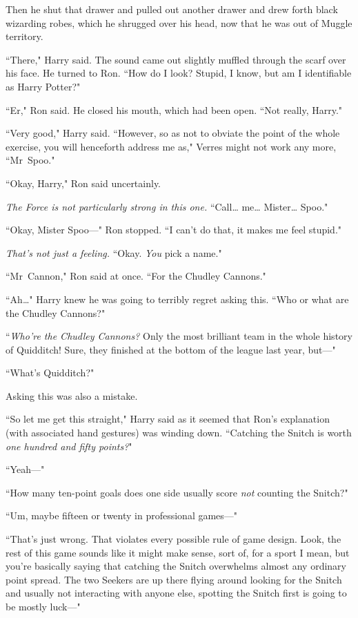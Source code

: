 Then he shut that drawer and pulled out another drawer and drew forth black wizarding robes, which he shrugged over his head, now that he was out of Muggle territory.

``There," Harry said. The sound came out slightly muffled through the scarf over his face. He turned to Ron. ``How do I look? Stupid, I know, but am I identifiable as Harry Potter?"

``Er," Ron said. He closed his mouth, which had been open. ``Not really, Harry."

``Very good," Harry said. ``However, so as not to obviate the point of the whole exercise, you will henceforth address me as," Verres might not work any more, ``Mr~Spoo."

``Okay, Harry," Ron said uncertainly.

\emph{The Force is not particularly strong in this one.} ``Call{\ldots} me{\ldots} Mister{\ldots} Spoo."

``Okay, Mister Spoo—" Ron stopped. ``I can't do that, it makes me feel stupid."

\emph{That's not just a feeling.} ``Okay. \emph{You} pick a name."

``Mr~Cannon," Ron said at once. ``For the Chudley Cannons."

``Ah{\ldots}" Harry knew he was going to terribly regret asking this. ``Who or what are the Chudley Cannons?"

``\emph{Who're the Chudley Cannons?} Only the most brilliant team in the whole history of Quidditch! Sure, they finished at the bottom of the league last year, but—"

``What's Quidditch?"

Asking this was also a mistake.

``So let me get this straight," Harry said as it seemed that Ron's explanation (with associated hand gestures) was winding down. ``Catching the Snitch is worth \emph{one hundred and fifty points?}"

``Yeah—"

``How many ten-point goals does one side usually score \emph{not} counting the Snitch?"

``Um, maybe fifteen or twenty in professional games—"

``That's just wrong. That violates every possible rule of game design. Look, the rest of this game sounds like it might make sense, sort of, for a sport I mean, but you're basically saying that catching the Snitch overwhelms almost any ordinary point spread. The two Seekers are up there flying around looking for the Snitch and usually not interacting with anyone else, spotting the Snitch first is going to be mostly luck—"

